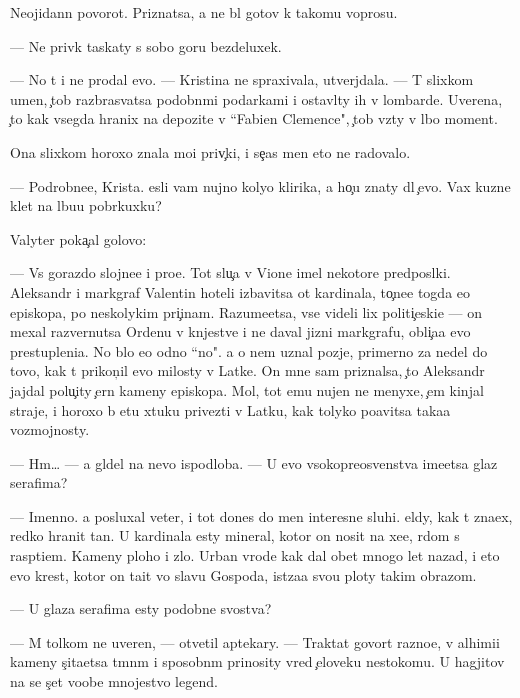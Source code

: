 \documentclass[10pt]{book}
\begin{document}
Neojidann{\yi}{\y} povorot. Priznatsa, {\y}a ne b{\yi}l gotov k takomu voprosu.

— Ne priv{\yi}k taskaty s sobo{\y} goru bezdeluxek.

— No t{\yi} i ne prodal {\y}evo. — Kristina ne spraxivala, utverjdala. — T{\yi} slixkom umen, {\c}tob{\yi} razbras{\yi}vatsa podobn{\yi}mi podarkami i ostavl{\ia}ty ih v lombarde. Uverena, {\c}to kak vsegda hranix na depozite v ``Fabien Clemence", {\c}tob{\yi} vz{\ia}ty v l{\iu}bo{\y} moment.

Ona slixkom horoxo znala mo{\y}i priv{\yi}{\c}ki, i se{\y}{\c}as men{\ia} eto ne radovalo.

— Podrobne{\y}e, Krista. {\Y}esli vam nujno koly{\q}o klirika, {\y}a ho{\c}u znaty dl{\ia} {\c}evo. Vax kuzne{\q} kl{\iu}{\y}et na l{\iu}bu{\y}u pobr{\ia}kuxku?

Valyter poka{\c}al golovo{\y}:

— Vs{\e} gorazdo slojne{\y}e i pro{\x}e. Tot slu{\c}a{\y} v Vione imel nekotor{\yi}{\y}e predpos{\yi}lki. Aleksandr i markgraf Valentin hoteli izbavitsa ot kardinala, to{\c}ne{\y}e togda {\y}e{\x}o {\y}episkopa, po neskolykim pri{\c}inam. Razume{\y}etsa, vse videli lix politi{\c}eski{\y}e — on mexal razvernutsa Ordenu v kn{\ia}jestve i ne daval jizni markgrafu, obli{\c}a{\y}a {\y}evo prestupleni{\y}a. No b{\yi}lo {\y}e{\x}o odno ``no". {\Y}a o nem uznal pozje, primerno za nedel{\iu} do tovo, kak t{\yi} prikon{\c}il {\y}evo milosty v Latke. On mne sam priznalsa, {\c}to Aleksandr jajdal polu{\c}ity {\c}ern{\yi}{\y} kameny {\y}episkopa. Mol, tot {\y}emu nujen ne menyxe, {\c}em kinjal{\yi} straje{\y}, i horoxo b{\yi} etu xtuku privezti v Latku, kak tolyko po{\y}avitsa taka{\y}a vozmojnosty.

— Hm… — {\Y}a gl{\ia}del na nevo ispodlob{\y}a. — U {\y}evo v{\yi}sokopreosv{\ia}{\x}enstva ime{\y}etsa glaz serafima?

— Imenno. {\Y}a posluxal veter, i tot dones do men{\ia} interesn{\yi}{\y}e sluhi. {\C}el{\ia}dy, kak t{\yi} zna{\y}ex, redko hranit ta{\y}n{\yi}. U kardinala {\y}esty mineral, kotor{\yi}{\y} on nosit na xe{\y}e, r{\ia}dom s rasp{\ia}ti{\y}em. Kameny ploho{\y} i zlo{\y}. Urban vrode kak dal obet mnogo let nazad, i eto {\y}evo krest, kotor{\yi}{\y} on ta{\x}it vo slavu Gospoda, ist{\ia}za{\y}a svo{\y}u ploty takim obrazom.

— U glaza serafima {\y}esty podobn{\yi}{\y}e svo{\y}stva?

— M{\yi} tolkom ne uveren{\yi}, — otvetil aptekary. — Traktat{\yi} govor{\ia}t razno{\y}e, v alhimi{\y}i kameny s{\c}ita{\y}etsa t{\e}mn{\yi}m i sposobn{\yi}m prinosity vred {\c}eloveku nesto{\y}komu. U hagjitov na se{\y} s{\c}et voob{\x}e mnojestvo legend.
\end{document}
